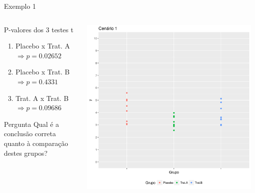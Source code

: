 \documentclass{beamer}
\begin{document}
\begin{frame}{Exemplo 1}
  \begin{columns}
    \begin{column}{5cm}
      \begin{exampleblock}{P-valores dos 3 testes t}
        \tiny
        \begin{enumerate}
        \item Placebo x Trat. A $\Rightarrow p=0.02652$
        \item Placebo x Trat. B $\Rightarrow p=0.4331$
        \item Trat. A x Trat. B $\Rightarrow p=0.09686$
        \end{enumerate}
      \end{exampleblock}
      \begin{exampleblock}{Pergunta}
        \small
        Qual é a conclusão correta quanto à comparação destes grupos?
      \end{exampleblock}
    \end{column}
    \begin{column}{5cm}
      \includegraphics[width=\textwidth]{Topicos_adv/cenario1}
    \end{column}
  \end{columns}
\end{frame}
\end{document}
